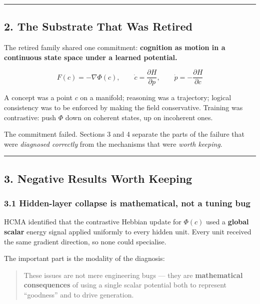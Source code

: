 \documentclass[
  11pt,
  a4paper,
]{article}
\begin{document}
\begin{center}\rule{0.5\linewidth}{0.5pt}\end{center}

\subsection{2. The Substrate That Was
Retired}\label{the-substrate-that-was-retired}

The retired family shared one commitment: \textbf{cognition as motion in
a continuous state space under a learned potential.}

\[
F(c) = -\nabla \Phi(c), \qquad
\dot{c} = \frac{\partial H}{\partial p}, \qquad
\dot{p} = -\frac{\partial H}{\partial c}
\]

A concept was a point \(c\) on a manifold; reasoning was a trajectory;
logical consistency was to be enforced by making the field conservative.
Training was contrastive: push \(\Phi\) down on coherent states, up on
incoherent ones.

The commitment failed. Sections 3 and 4 separate the parts of the
failure that were \emph{diagnosed correctly} from the mechanisms that
were \emph{worth keeping}.

\begin{center}\rule{0.5\linewidth}{0.5pt}\end{center}

\subsection{3. Negative Results Worth
Keeping}\label{negative-results-worth-keeping}

\subsubsection{3.1 Hidden-layer collapse is mathematical, not a tuning
bug}\label{hidden-layer-collapse-is-mathematical-not-a-tuning-bug}

HCMA identified that the contrastive Hebbian update for \(\Phi(c)\) used
a \textbf{global scalar} energy signal applied uniformly to every hidden
unit. Every unit received the same gradient direction, so none could
specialise.

The important part is the modality of the diagnosis:

\begin{quote}
These issues are not mere engineering bugs --- they are
\textbf{mathematical consequences} of using a single scalar potential
both to represent ``goodness'' and to drive generation.
\end{quote}
\end{document}
